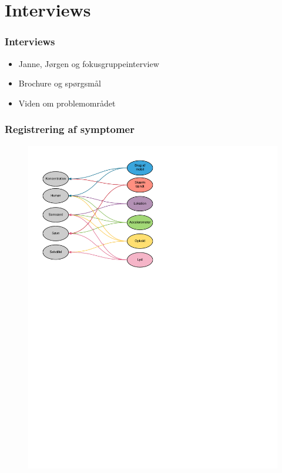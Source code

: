 \section{Interviews}

\begin{frame}
\frametitle{Interviews}
\begin{itemize}
	\item Janne, Jørgen og fokusgruppeinterview
	\item Brochure og spørgsmål
	\item Viden om problemområdet
\end{itemize}
\end{frame}

\begin{frame}
\frametitle{Registrering af symptomer}
\begin{figure}
	\includegraphics[scale=0.7, trim= 1cm 17cm 10cm 1cm, clip]{graphics/kobling.pdf}
\end{figure}
\end{frame}


